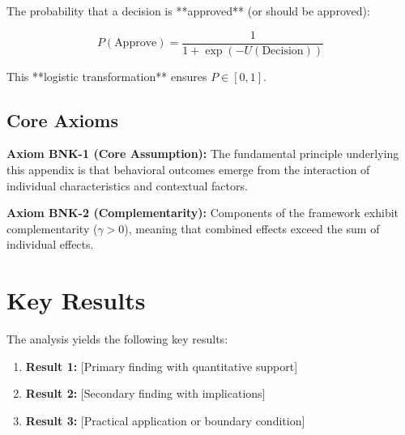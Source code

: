 \documentclass[11pt]{article}
\begin{document}
The probability that a decision is **approved** (or should be approved):

\begin{equation}
P(\text{Approve}) = \frac{1}{1 + \exp(-U(\text{Decision}))}
\end{equation}

This **logistic transformation** ensures $P \in [0, 1]$.


\subsection{Core Axioms}
\label{sec:bnk-axioms}

\begin{tcolorbox}[colback=yellow!5!white,colframe=yellow!75!black,title=Axiom BNK-1: Fundamental Principle]
\textbf{Axiom BNK-1 (Core Assumption):}
The fundamental principle underlying this appendix is that behavioral outcomes
emerge from the interaction of individual characteristics and contextual factors.
\end{tcolorbox}

\begin{tcolorbox}[colback=yellow!5!white,colframe=yellow!75!black,title=Axiom BNK-2: Complementarity]
\textbf{Axiom BNK-2 (Complementarity):}
Components of the framework exhibit complementarity ($\gamma > 0$), meaning
that combined effects exceed the sum of individual effects.
\end{tcolorbox}



\section{Key Results}
\label{sec:bnk-results}

The analysis yields the following key results:

\begin{enumerate}
    \item \textbf{Result 1:} [Primary finding with quantitative support]
    \item \textbf{Result 2:} [Secondary finding with implications]
    \item \textbf{Result 3:} [Practical application or boundary condition]
\end{enumerate}
\end{document}
